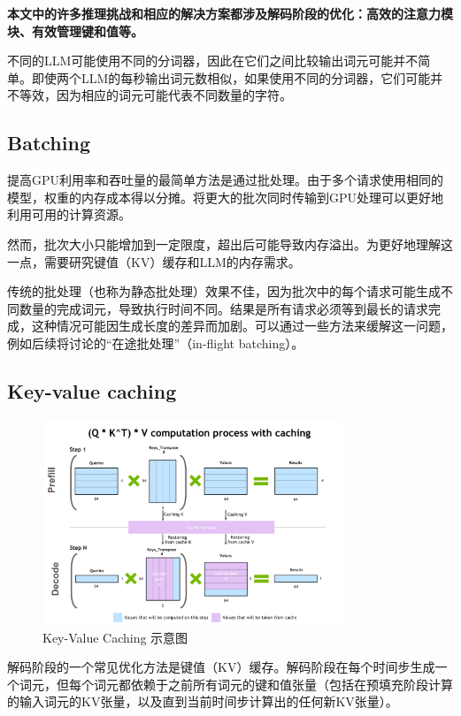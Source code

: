 \documentclass[twocolumn, 10pt]{article} %
\theoremstyle{remark}
\begin{document}
\textbf{本文中的许多推理挑战和相应的解决方案都涉及解码阶段的优化：高效的注意力模块、有效管理键和值等。}

不同的LLM可能使用不同的分词器，因此在它们之间比较输出词元可能并不简单。即使两个LLM的每秒输出词元数相似，如果使用不同的分词器，它们可能并不等效，因为相应的词元可能代表不同数量的字符。




\subsection{Batching}
提高GPU利用率和吞吐量的最简单方法是通过批处理。由于多个请求使用相同的模型，权重的内存成本得以分摊。将更大的批次同时传输到GPU处理可以更好地利用可用的计算资源。

然而，批次大小只能增加到一定限度，超出后可能导致内存溢出。为更好地理解这一点，需要研究键值（KV）缓存和LLM的内存需求。

传统的批处理（也称为静态批处理）效果不佳，因为批次中的每个请求可能生成不同数量的完成词元，导致执行时间不同。结果是所有请求必须等到最长的请求完成，这种情况可能因生成长度的差异而加剧。可以通过一些方法来缓解这一问题，例如后续将讨论的“在途批处理”（in-flight batching）。

\subsection{Key-value caching}
\begin{figure}[ht]
    \centering
    \includegraphics[width=0.8\textwidth]{key-value-caching_.png}
    \caption{Key-Value Caching 示意图}
\end{figure}


解码阶段的一个常见优化方法是键值（KV）缓存。解码阶段在每个时间步生成一个词元，但每个词元都依赖于之前所有词元的键和值张量（包括在预填充阶段计算的输入词元的KV张量，以及直到当前时间步计算出的任何新KV张量）。
\end{document}
